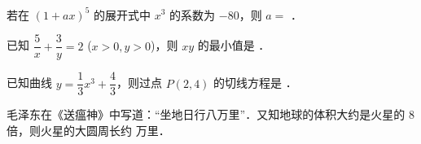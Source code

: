 \begin{question}
若在 $(1 + ax)^5$ 的展开式中 $x^3$ 的系数为 $-80$，则 $a =$ \gkblank{}．

\end{question}
\begin{question}
已知 $\dfrac{5}{x} + \dfrac{3}{y} = 2$ ($x > 0, y > 0$)，则 $xy$ 的最小值是 \gkblank{}．

\end{question}
\begin{question}
已知曲线 $y = \dfrac{1}{3}x^3 + \dfrac{4}{3}$，则过点 $P(2, 4)$ 的切线方程是 \gkblank{}．

\end{question}
\begin{question}
毛泽东在《送瘟神》中写道：“坐地日行八万里”．又知地球的体积大约是火星的 $8$ 倍，则火星的大圆周长约 \gkblank{} 万里．

\end{question}

